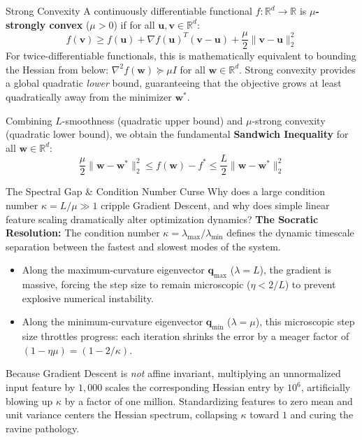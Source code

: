 \begin{definitionbox}{Strong Convexity}
A continuously differentiable functional $f: \mathbb{R}^d \to \mathbb{R}$ is \textbf{$\mu$-strongly convex} ($\mu > 0$) if for all $\mathbf{u}, \mathbf{v} \in \mathbb{R}^d$:
\begin{equation}
f(\mathbf{v}) \ge f(\mathbf{u}) + \nabla f(\mathbf{u})^T (\mathbf{v} - \mathbf{u}) + \frac{\mu}{2} \|\mathbf{v} - \mathbf{u}\|_2^2
\label{eq:strong_convexity}
\end{equation}
For twice-differentiable functionals, this is mathematically equivalent to bounding the Hessian from below: $\nabla^2 f(\mathbf{w}) \succeq \mu I$ for all $\mathbf{w} \in \mathbb{R}^d$. Strong convexity provides a global quadratic \emph{lower} bound, guaranteeing that the objective grows at least quadratically away from the minimizer $\mathbf{w}^*$.
\end{definitionbox}

Combining $L$-smoothness (quadratic upper bound) and $\mu$-strong convexity (quadratic lower bound), we obtain the fundamental \textbf{Sandwich Inequality} for all $\mathbf{w} \in \mathbb{R}^d$:
\begin{equation}
\frac{\mu}{2} \|\mathbf{w} - \mathbf{w}^*\|_2^2 \le f(\mathbf{w}) - f^* \le \frac{L}{2} \|\mathbf{w} - \mathbf{w}^*\|_2^2
\label{eq:sandwich_bound}
\end{equation}

\begin{ponderbox}{The Spectral Gap \& Condition Number Curse}
Why does a large condition number $\kappa = L / \mu \gg 1$ cripple Gradient Descent, and why does simple linear feature scaling dramatically alter optimization dynamics?
\tcblower
\textbf{The Socratic Resolution:} The condition number $\kappa = \lambda_{\max} / \lambda_{\min}$ defines the dynamic timescale separation between the fastest and slowest modes of the system. 
\begin{itemize}
    \item Along the maximum-curvature eigenvector $\mathbf{q}_{\max}$ ($\lambda = L$), the gradient is massive, forcing the step size to remain microscopic ($\eta < 2/L$) to prevent explosive numerical instability.
    \item Along the minimum-curvature eigenvector $\mathbf{q}_{\min}$ ($\lambda = \mu$), this microscopic step size throttles progress: each iteration shrinks the error by a meager factor of $(1 - \eta \mu) = (1 - 2/\kappa)$.
\end{itemize}
Because Gradient Descent is \emph{not} affine invariant, multiplying an unnormalized input feature by $1{,}000$ scales the corresponding Hessian entry by $10^6$, artificially blowing up $\kappa$ by a factor of one million. Standardizing features to zero mean and unit variance centers the Hessian spectrum, collapsing $\kappa$ toward $1$ and curing the ravine pathology.
\end{ponderbox}

